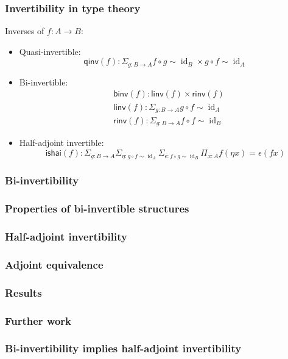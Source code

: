 \documentclass[presentation]{beamer}
\DeclareMathOperator{\id}{id}
\begin{document}
\begin{frame}
  \frametitle{Invertibility in type theory}
  Inverses of \(f : A \to B\):
  \begin{itemize}
  \item Quasi-invertible:
    \[ \mathsf{qinv}(f) : \Sigma_{g : B \to A} f \circ g \sim \id_B \times g \circ f \sim \id_A\]
  \item Bi-invertible:
    \begin{align*}
      &\mathsf{binv}(f) : \mathsf{linv}(f) \times \mathsf{rinv}(f) \\
      &\mathsf{linv}(f) : \Sigma_{g : B \to A} g \circ f \sim \id_A \\
      &\mathsf{rinv}(f) : \Sigma_{g : B \to A} f \circ f \sim \id_B
    \end{align*}
  \item Half-adjoint invertible:
    \[ \mathsf{ishai}(f) : \Sigma_{g : B \to A} \Sigma_{\eta : g \circ f \sim \id_A} \Sigma_{\epsilon : f \circ g \sim \id_B} \Pi_{x : A} f(\eta x) = \epsilon(f x) \]


  \end{itemize}
\end{frame}

\begin{frame}
  \frametitle{Bi-invertibility}
\end{frame}

\begin{frame}
  \frametitle{Properties of bi-invertible structures}
\end{frame}

\begin{frame}
  \frametitle{Half-adjoint invertibility}
\end{frame}

\begin{frame}
  \frametitle{Adjoint equivalence}
\end{frame}

\begin{frame}
  \frametitle{Results}

\end{frame}

\begin{frame}
  \frametitle{Further work}
\end{frame}

\begin{frame}
  \frametitle{Bi-invertibility implies half-adjoint invertibility}
\end{frame}
\end{document}
